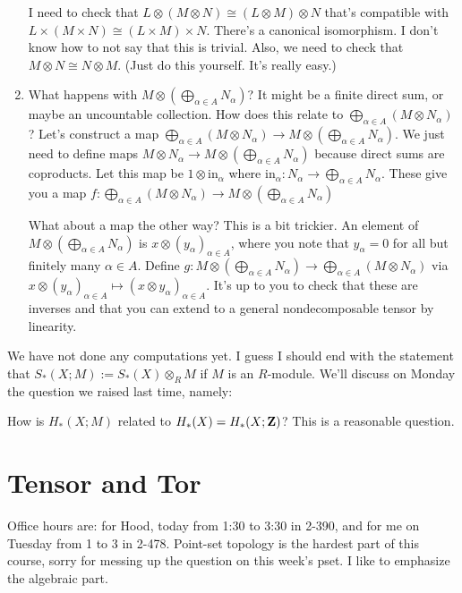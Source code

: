 \begin{enumerate}
I need to check that $L\otimes(M\otimes N)\cong (L\otimes M)\otimes N$ that's compatible with $L\times (M\times N)\cong (L\times M)\times N$. There's a canonical isomorphism. I don't know how to not say that this is trivial. Also, we need to check that $M\otimes N\cong N\otimes M$. (Just do this yourself. It's really easy.)
\item What happens with $M\otimes\left(\bigoplus_{\alpha\in A}N_\alpha\right)$? It might be a finite direct sum, or maybe an uncountable collection. How does this relate to $\bigoplus_{\alpha\in A}(M\otimes N_\alpha)$? Let's construct a map $\displaystyle\bigoplus_{\alpha\in A}(M\otimes N_\alpha)\to M\otimes\left(\bigoplus_{\alpha\in A}N_\alpha\right)$. We just need to define maps $M\otimes N_\alpha\to M\otimes\left(\bigoplus_{\alpha\in A}N_\alpha\right)$ because direct sums are coproducts. Let this map be $1\otimes\text{in}_\alpha$ where $\mathrm{in}_\alpha:N_\alpha\to \bigoplus_{\alpha\in A}N_\alpha$. These give you a map $f:\bigoplus_{\alpha\in A}(M\otimes N_\alpha)\to M\otimes\left(\bigoplus_{\alpha\in A}N_\alpha\right)$

What about a map the other way? This is a bit trickier. An element of $M\otimes\left(\bigoplus_{\alpha\in A}N_\alpha\right)$ is $x\otimes(y_\alpha)_{\alpha\in A}$, where you note that $y_\alpha=0$ for all but finitely many $\alpha\in A$. Define $g:M\otimes\left(\bigoplus_{\alpha\in A}N_\alpha\right)\to \bigoplus_{\alpha\in A}(M\otimes N_\alpha)$ via $x\otimes(y_\alpha)_{\alpha\in A}\mapsto (x\otimes y_\alpha)_{\alpha\in A}$. It's up to you to check that these are inverses and that you can extend to a general nondecomposable tensor by linearity.
\end{enumerate}
We have not done any computations yet. I guess I should end with the statement that $S_\ast(X;M):=S_\ast(X)\otimes_R M$ if $M$ is an $R$-module. We'll discuss on Monday the question we raised last time, namely:
\begin{question}
How is $ H_\ast(X;M)$ related to $ H_\ast(X)= H_\ast(X;\mathbf Z)$? This is a reasonable question.
\end{question}
\section{Tensor and Tor}
Office hours are: for Hood, today from 1:30 to 3:30 in 2-390, and for me on Tuesday from 1 to 3 in 2-478. Point-set topology is the hardest part of this course, sorry for messing up the question on this week's pset. I like to emphasize the algebraic part.
